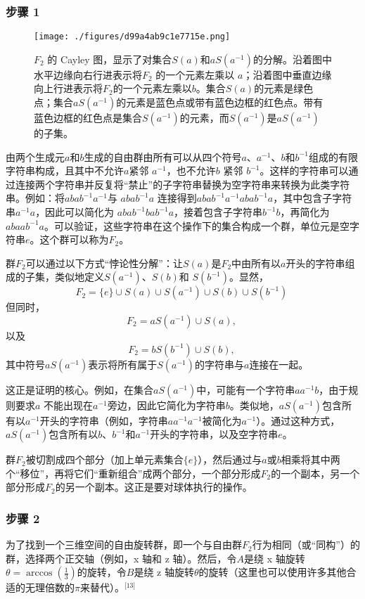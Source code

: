 \subsubsection{步骤 1}
\begin{figure}[ht]
\centering
\texttt{[image: ./figures/d99a4ab9c1e7715e.png]}
\caption{\( F_2 \) 的 Cayley 图，显示了对集合\( S(a) \)和\( aS(a^{-1}) \)的分解。沿着图中水平边缘向右行进表示将\( F_2 \) 的一个元素左乘以 \( a \)；沿着图中垂直边缘向上行进表示将\( F_2 \)的一个元素左乘以\( b \)。集合\( S(a) \)的元素是绿色点；集合\( aS(a^{-1}) \)的元素是蓝色点或带有蓝色边框的红色点。带有蓝色边框的红色点是集合\( S(a^{-1}) \)的元素，而\( S(a^{-1}) \)是\( aS(a^{-1}) \) 的子集。} \label{fig_BTS_2}
\end{figure}
由两个生成元\( a \)和\( b \)生成的自由群由所有可以从四个符号\( a \)、\( a^{-1} \)、\( b \)和\( b^{-1} \)组成的有限字符串构成，且其中不允许\( a \)紧邻 \( a^{-1} \)，也不允许\( b \) 紧邻 \( b^{-1} \)。这样的字符串可以通过连接两个字符串并反复将“禁止”的子字符串替换为空字符串来转换为此类字符串。例如：将\( abab^{-1}a^{-1} \)与 \( abab^{-1}a \) 连接得到\( abab^{-1}a^{-1}abab^{-1}a \)，其中包含子字符串\( a^{-1}a \)，因此可以简化为 \( abab^{-1}bab^{-1}a \)，接着包含子字符串\( b^{-1}b \)，再简化为\( abaab^{-1}a \)。可以验证，这些字符串在这个操作下的集合构成一个群，单位元是空字符串\( e \)。这个群可以称为\( F_2 \)。

群\( F_2 \)可以通过以下方式“悖论性分解”：让\( S(a) \)是\( F_2 \)中由所有以\( a \)开头的字符串组成的子集，类似地定义\( S(a^{-1}) \)、\( S(b) \)和 \( S(b^{-1}) \)。显然，
\[
F_2 = \{ e \} \cup S(a) \cup S(a^{-1}) \cup S(b) \cup S(b^{-1})~
\]
但同时，
\[
F_2 = aS(a^{-1}) \cup S(a),~
\]
以及
\[
F_2 = bS(b^{-1}) \cup S(b),~
\]
其中符号\( aS(a^{-1}) \)表示将所有属于\( S(a^{-1}) \)的字符串与\( a \)连接在一起。

这正是证明的核心。例如，在集合\( aS(a^{-1}) \)中，可能有一个字符串\( aa^{-1}b \)，由于规则要求\( a \) 不能出现在\( a^{-1} \)旁边，因此它简化为字符串\( b \)。类似地，\( aS(a^{-1}) \)包含所有以\( a^{-1} \)开头的字符串（例如，字符串\( aa^{-1}a^{-1} \)被简化为\( a^{-1} \)）。通过这种方式，\( aS(a^{-1}) \)包含所有以\( b \)、\( b^{-1} \)和\( a^{-1} \)开头的字符串，以及空字符串\( e \)。

群\( F_2 \)被切割成四个部分（加上单元素集合\( \{e\} \)），然后通过与\( a \)或\( b \)相乘将其中两个“移位”，再将它们“重新组合”成两个部分，一个部分形成\( F_2 \)的一个副本，另一个部分形成\( F_2 \)的另一个副本。这正是要对球体执行的操作。
\subsubsection{步骤 2}  
为了找到一个三维空间的自由旋转群，即一个与自由群\( F_2 \)行为相同（或“同构”）的群，选择两个正交轴（例如，x 轴和 z 轴）。然后，令\( A \)是绕 x 轴旋转\( \theta = \arccos \left( \frac{1}{3} \right) \)的旋转，令\( B \)是绕 z 轴旋转\( \theta \)的旋转（这里也可以使用许多其他合适的无理倍数的\( \pi \)来替代）。\(^\text{[13]}\)

